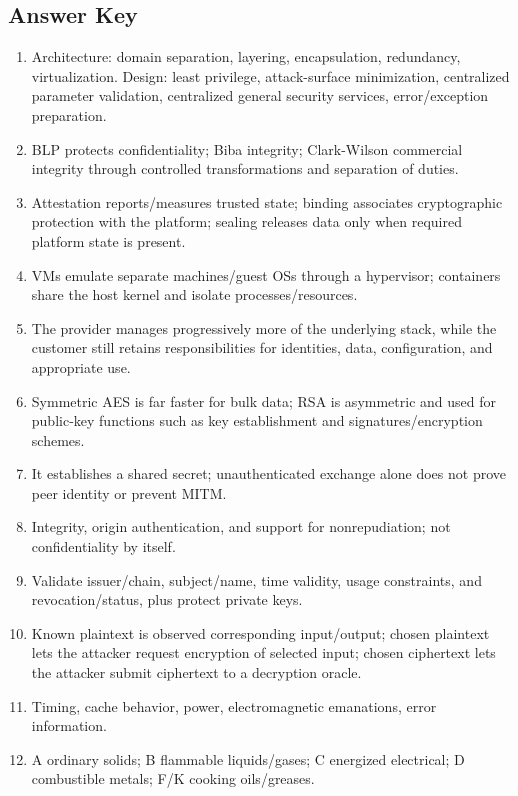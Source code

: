 \documentclass[10pt,letterpaper]{article}
\begin{document}
\subsection*{Answer Key}
\begin{enumerate}
\item Architecture: domain separation, layering, encapsulation, redundancy, virtualization. Design: least privilege, attack-surface minimization, centralized parameter validation, centralized general security services, error/exception preparation.
\item BLP protects confidentiality; Biba integrity; Clark-Wilson commercial integrity through controlled transformations and separation of duties.
\item Attestation reports/measures trusted state; binding associates cryptographic protection with the platform; sealing releases data only when required platform state is present.
\item VMs emulate separate machines/guest OSs through a hypervisor; containers share the host kernel and isolate processes/resources.
\item The provider manages progressively more of the underlying stack, while the customer still retains responsibilities for identities, data, configuration, and appropriate use.
\item Symmetric AES is far faster for bulk data; RSA is asymmetric and used for public-key functions such as key establishment and signatures/encryption schemes.
\item It establishes a shared secret; unauthenticated exchange alone does not prove peer identity or prevent MITM.
\item Integrity, origin authentication, and support for nonrepudiation; not confidentiality by itself.
\item Validate issuer/chain, subject/name, time validity, usage constraints, and revocation/status, plus protect private keys.
\item Known plaintext is observed corresponding input/output; chosen plaintext lets the attacker request encryption of selected input; chosen ciphertext lets the attacker submit ciphertext to a decryption oracle.
\item Timing, cache behavior, power, electromagnetic emanations, error information.
\item A ordinary solids; B flammable liquids/gases; C energized electrical; D combustible metals; F/K cooking oils/greases.
\end{enumerate}
\end{document}
